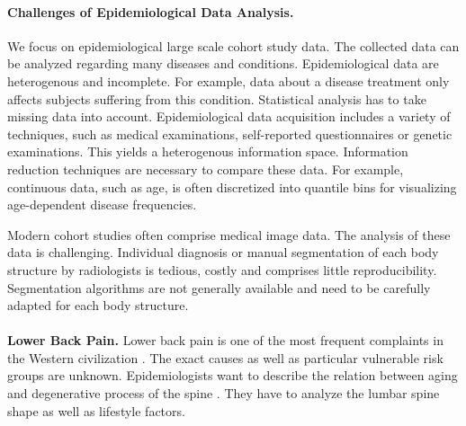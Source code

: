 \documentclass[a4paper,twoside]{style/article}
\begin{document}
\paragraph{Challenges of Epidemiological Data Analysis.}
We focus on epidemiological large scale cohort study data.
The collected data can be analyzed regarding many diseases and conditions.
Epidemiological data are heterogenous and incomplete.
For example, data about a disease treatment only affects subjects suffering from this condition.
Statistical analysis has to take missing data into account.
Epidemiological data acquisition includes a variety of techniques, such as medical examinations, self-reported questionnaires or genetic examinations.
This yields a heterogenous information space.
Information reduction techniques are necessary to compare these data.
For example, continuous data, such as age, is often discretized into quantile bins for visualizing age-dependent disease frequencies.

Modern cohort studies often comprise medical image data.
The analysis of these data is challenging.
Individual diagnosis or manual segmentation of each body structure by radiologists is tedious, costly and comprises little reproducibility.
Segmentation algorithms are not generally available and need to be carefully adapted for each body structure.
\\\\
\noindent \textbf{Lower Back Pain.}
Lower back pain is one of the most frequent complaints in the Western civilization \cite{Hoy2010}.
The exact causes as well as particular vulnerable risk groups are unknown.
Epidemiologists want to describe the relation between aging and degenerative process of the spine \cite{Szpalski2005}.
They have to analyze the lumbar spine shape as well as lifestyle factors.
\end{document}
